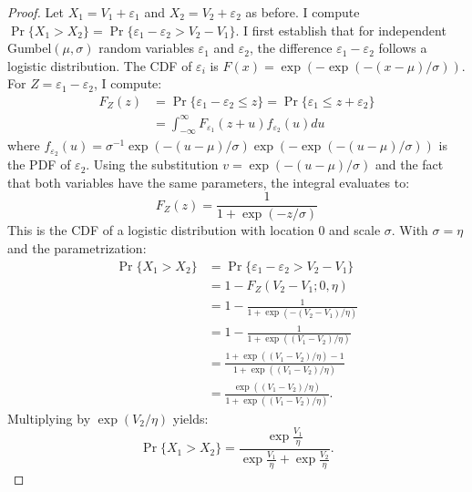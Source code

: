 \documentclass[12pt]{article}
\theoremstyle{plain}
\begin{document}
\begin{proof}
	Let $X_1 = V_1 + \varepsilon_1$ and $X_2 = V_2 + \varepsilon_2$ as before. I compute $\Pr\{X_1 > X_2\} = \Pr\{\varepsilon_1 - \varepsilon_2 > V_2 - V_1\}$. I first establish that for independent Gumbel$(\mu, \sigma)$ random variables
	$\varepsilon_1$ and $\varepsilon_2$, the difference $\varepsilon_1 -
		\varepsilon_2$ follows a logistic distribution. The CDF of $\varepsilon_i$ is
	$F(x) = \exp(-\exp(-(x-\mu)/\sigma))$. For $Z = \varepsilon_1 - \varepsilon_2$,
	I compute:
	\begin{align*}
		F_Z(z) & = \Pr\{\varepsilon_1 - \varepsilon_2 \leq z\} = \Pr\{\varepsilon_1 \leq z + \varepsilon_2\} \\
		       & = \int_{-\infty}^{\infty} F_{\varepsilon_1}(z + u) f_{\varepsilon_2}(u) du
	\end{align*}
	where $f_{\varepsilon_2}(u) = \sigma^{-1}\exp(-(u-\mu)/\sigma)\exp(-\exp(-(u-\mu)/\sigma))$ is the PDF of $\varepsilon_2$. Using the substitution $v = \exp(-(u-\mu)/\sigma)$ and the fact that both variables have the same parameters, the integral evaluates to:
	\begin{equation*}
		F_Z(z) = \frac{1}{1 + \exp(-z/\sigma)}
	\end{equation*}
	This is the CDF of a logistic distribution with location 0 and scale $\sigma$.	With $\sigma = \eta$ and the parametrization:
	\begin{align*}
		\Pr\{X_1 > X_2\} & = \Pr\{\varepsilon_1 - \varepsilon_2 > V_2 - V_1\}                  \\
		                 & = 1 - F_{Z}(V_2 - V_1; 0, \eta)                                     \\
		                 & = 1 - \frac{1}{1 + \exp(-(V_2 - V_1)/\eta)}                         \\
		                 & = 1 - \frac{1}{1 + \exp((V_1 - V_2)/\eta)}                          \\
		                 & = \frac{1 + \exp((V_1 - V_2)/\eta) - 1}{1 + \exp((V_1 - V_2)/\eta)} \\
		                 & = \frac{\exp((V_1 - V_2)/\eta)}{1 + \exp((V_1 - V_2)/\eta)}.
	\end{align*}
	Multiplying by $\exp(V_2/\eta)$ yields:
	\begin{equation*}
		\Pr\{X_1 > X_2\} = \frac{\exp\frac{V_1}{\eta}}{\exp\frac{V_1}{\eta} + \exp\frac{V_2}{\eta}}.
	\end{equation*}
\end{proof}
\end{document}

